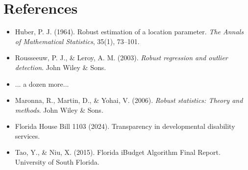 \section{References}

\begin{itemize}
    \item Huber, P. J. (1964). Robust estimation of a location parameter. \textit{The Annals of Mathematical Statistics}, 35(1), 73--101.
    \item Rousseeuw, P. J., \& Leroy, A. M. (2003). \textit{Robust regression and outlier detection}. John Wiley \& Sons.
    \item ... a dozen more...
    \item Maronna, R., Martin, D., \& Yohai, V. (2006). \textit{Robust statistics: Theory and methods}. John Wiley \& Sons.
    \item Florida House Bill 1103 (2024). Transparency in developmental disability services.
    \item Tao, Y., \& Niu, X. (2015). Florida iBudget Algorithm Final Report. University of South Florida.
\end{itemize}